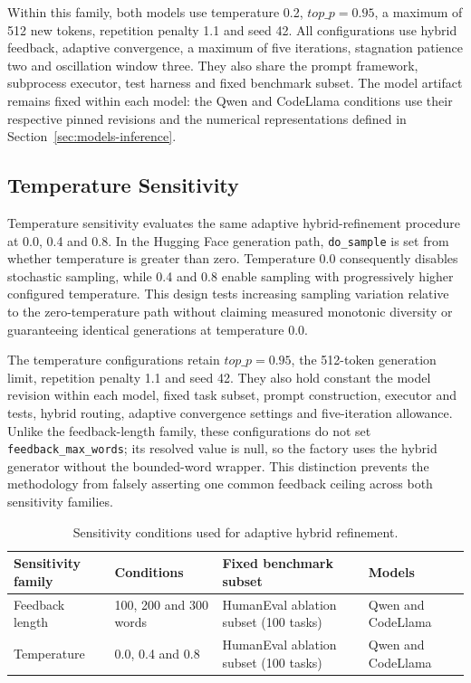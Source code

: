 Within this family, both models use temperature 0.2, \(\mathit{top\_p}=0.95\), a maximum of 512 new tokens, repetition penalty 1.1 and seed 42. All configurations use hybrid feedback, adaptive convergence, a maximum of five iterations, stagnation patience two and oscillation window three. They also share the prompt framework, subprocess executor, test harness and fixed benchmark subset. The model artifact remains fixed within each model: the Qwen and CodeLlama conditions use their respective pinned revisions and the numerical representations defined in Section~\ref{sec:models-inference}.

\subsection{Temperature Sensitivity}

Temperature sensitivity evaluates the same adaptive hybrid-refinement procedure at 0.0, 0.4 and 0.8. In the Hugging Face generation path, \texttt{do\_sample} is set from whether temperature is greater than zero. Temperature 0.0 consequently disables stochastic sampling, while 0.4 and 0.8 enable sampling with progressively higher configured temperature. This design tests increasing sampling variation relative to the zero-temperature path without claiming measured monotonic diversity or guaranteeing identical generations at temperature 0.0.

The temperature configurations retain \(\mathit{top\_p}=0.95\), the 512-token generation limit, repetition penalty 1.1 and seed 42. They also hold constant the model revision within each model, fixed task subset, prompt construction, executor and tests, hybrid routing, adaptive convergence settings and five-iteration allowance. Unlike the feedback-length family, these configurations do not set \texttt{feedback\_max\_words}; its resolved value is null, so the factory uses the hybrid generator without the bounded-word wrapper. This distinction prevents the methodology from falsely asserting one common feedback ceiling across both sensitivity families.

\begin{table}[htbp]
    \centering
    \caption{Sensitivity conditions used for adaptive hybrid refinement.}
    \label{tab:sensitivity-design}
    \footnotesize
    \renewcommand{\arraystretch}{1.15}
    \setlength{\tabcolsep}{3pt}
    \begin{tabular}{p{} p{} p{} p{}}
        \hline
        \raggedright Sensitivity family & \raggedright Conditions & \raggedright Fixed benchmark subset & \raggedright Models \tabularnewline
        \hline
        \raggedright Feedback length & \raggedright 100, 200 and 300 words & \raggedright HumanEval ablation subset (100 tasks) & \raggedright Qwen and CodeLlama \tabularnewline
        \raggedright Temperature & \raggedright 0.0, 0.4 and 0.8 & \raggedright HumanEval ablation subset (100 tasks) & \raggedright Qwen and CodeLlama \tabularnewline
        \hline
    \end{tabular}
\end{table}

